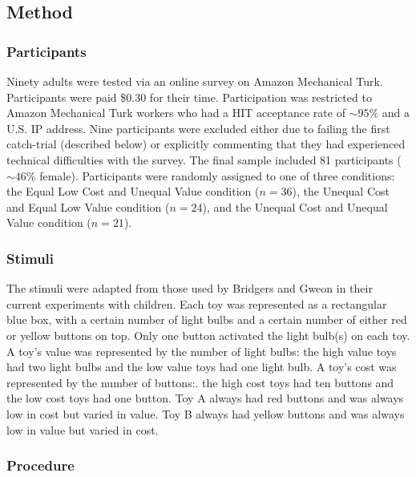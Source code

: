 \documentclass[10pt,letterpaper]{article}
\begin{document}
\subsection{Method}

\subsubsection{Participants}

Ninety adults were tested via an online survey on Amazon Mechanical Turk. Participants were paid \$0.30 for their time. Participation was restricted to Amazon Mechanical Turk workers who had a HIT acceptance rate of $\sim 95\%$ and a U.S. IP address. Nine participants were excluded either due to failing the first catch-trial (described below) or explicitly commenting that they had experienced technical difficulties with the survey. The final sample included 81 participants ($\sim 46\%$ female). Participants were randomly assigned to one of three conditions: the Equal Low Cost and Unequal Value condition ($n = 36$), the Unequal Cost and Equal Low Value condition ($n = 24$), and the Unequal Cost and Unequal Value condition ($n = 21$). 

\subsubsection{Stimuli}

The stimuli were adapted from those used by Bridgers and Gweon in their current experiments with children. Each toy was represented as a rectangular blue box, with a certain number of light bulbs and a certain number of either red or yellow buttons on top. Only one button activated the light bulb(s) on each toy. A toy's value was represented by the number of light bulbs: the high value toys had two light bulbs and the low value toys had one light bulb. A toy's cost was represented by the number of buttons:. the high cost toys had ten buttons and the low cost toys had one button. Toy A always had red buttons and was always low in cost but varied in value. Toy B always had yellow buttons and was always low in value but varied in cost.

\subsubsection{Procedure}
\end{document}
